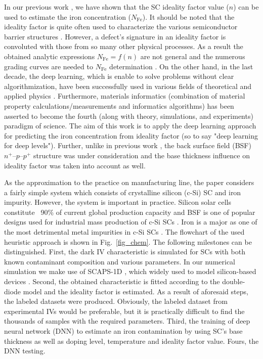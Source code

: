 \documentclass[a4paper,fleqn]{cas-sc}
\begin{document}
In our previous work \citep{Olikh2019SM}, we have shown that the SC ideality factor value ($n$) can be used to estimate the iron concentration ($N_{\mathrm{Fe}}$).
It should be noted that the ideality factor is quite often  used to characterize the various
semiconductor barrier structures \cite{Heide,Duan,n_CharGaN,n_CharSemic,n_CharPhysRevAppl}.
However, a defect's signature in an ideality factor is convoluted with those from so many other physical processes.
As a result the obtained analytic expressions $N_{\mathrm{Fe}}=f(n)$ are not general and the numerous grading curves are needed to $N_{\mathrm{Fe}}$ determination \citep{Olikh2019SM}.
On the other hand, in the last decade, the deep learning, which is enable to solve problems without clear algorithmization, have been successfully used in various fields of theoretical and applied physics \cite{MachLean_RevModPhys,MachLeanJAP,MachLeanPPV}.
Furthermore, materials informatics
(combination of material property calculations/measurements and informatics algorithms)
has been asserted \cite{MI_JAP} to become the fourth (along with theory, simulations, and experiments) paradigm of science.
The aim of this work is to apply the deep learning approach for predicting the iron concentration from ideality factor
(so to say "deep learning for deep levels").
Further, unlike in previous work \citep{Olikh2019SM}, the back surface field (BSF) $n^+$--$p$--$p^+$ structure was under consideration
and the base thickness influence on ideality factor was taken into account as well.

As the approximation to the practice on manufacturing line, the paper considers a fairly simple system
which consists of crystalline silicon (c-Si) SC  and iron impurity.
However, the system is important in practice.
Silicon solar cells constitute ~90\% of current global production capacity \citep{SCRev2015} and
BSF  is one of  popular designs used for industrial mass production of c-Si SCs \citep{SCRev2020}.
Iron is a major as one of the most detrimental metal impurities in c-Si SCs \citep{ZHU2016192,FeB:Schmidt,IronSC}.
The flowchart of the used heuristic approach is shown in Fig.~\ref{fig_chem}.
The following milestones can be distinguished.
First, the dark IV characteristic is simulated for SCs with both known contaminant composition and various parameters.
In our numerical simulation we make use of SCAPS-1D \cite{SCAPS1,SCAPS2}, 
which widely used to model silicon-based devices \cite{SCAPSuseSi4,SCAPSuseSi1,SCAPSuseSi6}.
Second, the obtained characteristic is fitted according to the double-diode model and the ideality factor is estimated.
As a result of aforesaid steps, the labeled datasets were produced.
Obviously, the labeled dataset from experimental IVs  would be preferable, 
but it is practically difficult to find the thousands of samples with the required parameters.
Third, the training of deep neural network (DNN) to estimate an iron contamination  by using SC's base thickness as well as doping level,
temperature and ideality factor value.
Fours, the DNN testing.
\end{document}
